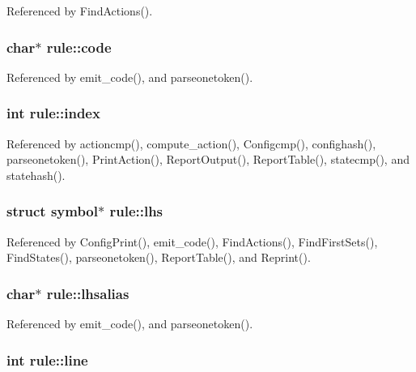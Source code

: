 Referenced by Find\-Actions().

\hypertarget{structrule_a7c09c584817f17fd7a33a42728b980fc}{
\subsubsection[{code}]{\setlength{\rightskip}{0pt plus 5cm}char$\ast$ rule\-::code}}\label{structrule_a7c09c584817f17fd7a33a42728b980fc}


Referenced by emit\-\_\-code(), and parseonetoken().

\hypertarget{structrule_a89c564aa2e092eb84b9a7a4368fb885a}{
\subsubsection[{index}]{\setlength{\rightskip}{0pt plus 5cm}int rule\-::index}}\label{structrule_a89c564aa2e092eb84b9a7a4368fb885a}


Referenced by actioncmp(), compute\-\_\-action(), Configcmp(), confighash(), parseonetoken(), Print\-Action(), Report\-Output(), Report\-Table(), statecmp(), and statehash().

\hypertarget{structrule_af3ef4d474e6a20c17fe3be8adcd460c9}{
\subsubsection[{lhs}]{\setlength{\rightskip}{0pt plus 5cm}struct {\bf symbol}$\ast$ rule\-::lhs}}\label{structrule_af3ef4d474e6a20c17fe3be8adcd460c9}


Referenced by Config\-Print(), emit\-\_\-code(), Find\-Actions(), Find\-First\-Sets(), Find\-States(), parseonetoken(), Report\-Table(), and Reprint().

\hypertarget{structrule_ac4567bea8eb9b9316ebadf2014fe9069}{
\subsubsection[{lhsalias}]{\setlength{\rightskip}{0pt plus 5cm}char$\ast$ rule\-::lhsalias}}\label{structrule_ac4567bea8eb9b9316ebadf2014fe9069}


Referenced by emit\-\_\-code(), and parseonetoken().

\hypertarget{structrule_a6d834a168ea936d857d83b6ec36c394e}{
\subsubsection[{line}]{\setlength{\rightskip}{0pt plus 5cm}int rule\-::line}}\label{structrule_a6d834a168ea936d857d83b6ec36c394e}


